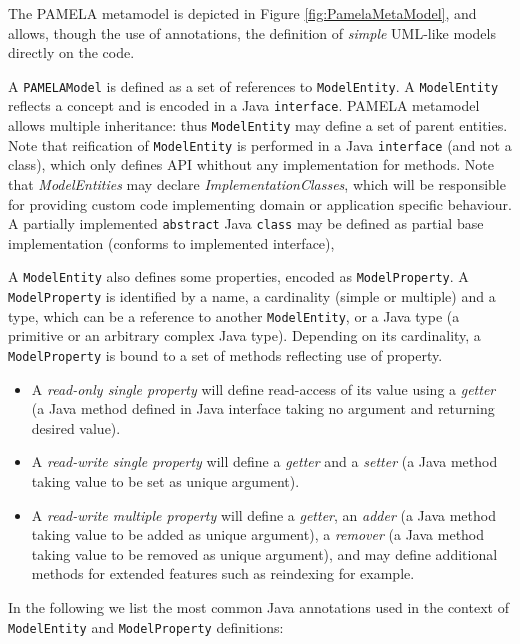 The PAMELA metamodel is depicted in Figure  \ref{fig:PamelaMetaModel}, and allows, though the use of annotations, the definition of \emph{simple} UML-like models directly on the code.

A \texttt{PAMELAModel} is defined as a set of references to \texttt{ModelEntity}. A \texttt{ModelEntity} reflects a concept and is encoded in a Java \texttt{interface}. PAMELA metamodel allows multiple inheritance: thus \texttt{ModelEntity} may define a set of parent entities. Note that reification of \texttt{ModelEntity} is performed in a Java \texttt{interface} (and not a class), which only defines API whithout any implementation for methods. 
Note that \emph{ModelEntities} may declare \emph{ImplementationClasses}, which
will be responsible for providing custom code implementing domain or
application specific behaviour. A partially implemented \texttt{abstract} Java
\texttt{class} may be defined as partial base implementation (conforms to
implemented interface), 

A \texttt{ModelEntity} also defines some properties, encoded as \texttt{ModelProperty}. A \texttt{ModelProperty} is identified by a name, a cardinality (simple or multiple) and a type, which can be a reference to another \texttt{ModelEntity}, or a Java type (a primitive or an arbitrary complex Java type). Depending on its cardinality, a \texttt{ModelProperty} is bound to a set of methods reflecting use of property.
\begin{itemize}
    \item A \emph{read-only single property} will define read-access of its value using a \emph{getter} (a Java method defined in Java interface taking no argument and returning desired value).
    \item A \emph{read-write single property} will define a \emph{getter} and a \emph{setter} (a Java method taking value to be set as unique argument).
    \item A \emph{read-write multiple property} will define a \emph{getter}, an \emph{adder} (a Java method taking value to be added as unique argument), a \emph{remover} (a Java method taking value to be removed as unique argument), and may define additional methods for extended features such as reindexing for example.
\end{itemize}


In the following we list the most common Java annotations used in the context of \texttt{ModelEntity} and \texttt{ModelProperty} definitions:

